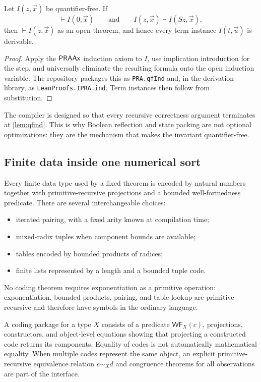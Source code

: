 \begin{lemma}\label{lem:qfind}
Let \(I(z,\vec x)\) be quantifier-free.  If
\[
  \vdash I(0,\vec x)
  \qquad\text{and}\qquad
  I(z,\vec x)\vdash I(Sz,\vec x),
\]
then \(\vdash I(z,\vec x)\) as an open theorem, and hence every term instance \(I(t,\vec u)\) is derivable.
\end{lemma}

\begin{proof}
Apply the \(\mathsf{PRAAx}\) induction axiom to \(I\), use implication introduction for the step, and universally eliminate the resulting formula onto the open induction variable.  The repository packages this as \texttt{PRA.qfInd} and, in the derivation library, as \texttt{LeanProofs.IPRA.ind}.  Term instances then follow from substitution.
\end{proof}

The compiler is designed so that every recursive correctness argument terminates at \cref{lem:qfind}.  This is why Boolean reflection and state packing are not optional optimizations: they are the mechanism that makes the invariant quantifier-free.

\subsection{Finite data inside one numerical sort}

Every finite data type used by a fixed theorem is encoded by natural numbers together with primitive-recursive projections and a bounded well-formedness predicate.  There are several interchangeable choices:
\begin{itemize}
  \item iterated pairing, with a fixed arity known at compilation time;
  \item mixed-radix tuples when component bounds are available;
  \item tables encoded by bounded products of radices;
  \item finite lists represented by a length and a bounded tuple code.
\end{itemize}
No coding theorem requires exponentiation as a primitive operation: exponentiation, bounded products, pairing, and table lookup are primitive recursive and therefore have symbols in the ordinary language.

A coding package for a type \(X\) consists of a predicate \(\mathsf{WF}_X(c)\), projections, constructors, and object-level equations showing that projecting a constructed code returns its components.  Equality of codes is not automatically mathematical equality.  When multiple codes represent the same object, an explicit primitive-recursive equivalence relation \(c\sim_X d\) and congruence theorems for all observations are part of the interface.

